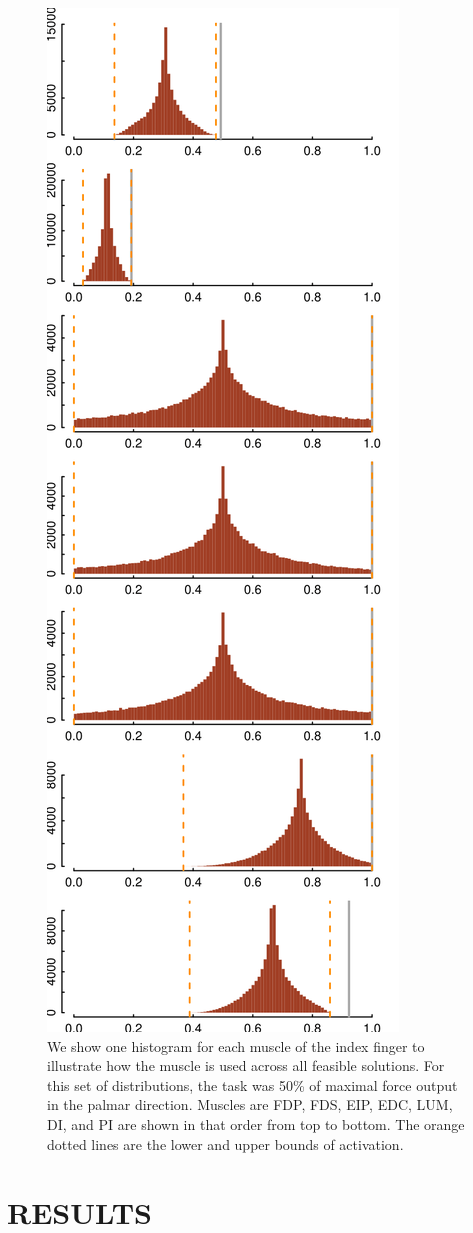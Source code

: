 \begin{figure}[htbp]
\centering
\includegraphics[width=7.5cmh]{sections/figs/raw_histograms.png}
\caption{We show one histogram for each muscle of the index finger to illustrate how the muscle is used across all feasible solutions.
For this set of distributions, the task was 50\% of maximal force output in the palmar direction. Muscles are FDP, FDS, EIP, EDC, LUM, DI, and PI are shown in that order from top to bottom. The orange dotted lines are the lower and upper bounds of activation.}
\label{fig:raw_histograms}
\end{figure}


\section{RESULTS}

